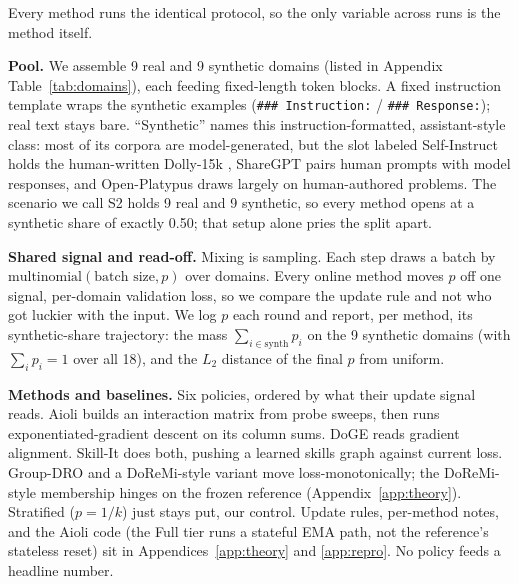 \documentclass{article}
\begin{document}
Every method runs the identical protocol, so the only variable across runs is the method itself.

\textbf{Pool.} We assemble 9 real and 9 synthetic domains (listed in Appendix Table~\ref{tab:domains}), each feeding fixed-length token blocks. A fixed instruction template wraps the synthetic examples (\texttt{\#\#\# Instruction:} / \texttt{\#\#\# Response:}); real text stays bare. ``Synthetic'' names this instruction-formatted, assistant-style class: most of its corpora are model-generated, but the slot labeled Self-Instruct holds the human-written Dolly-15k \citep{dolly2023}, ShareGPT pairs human prompts with model responses, and Open-Platypus draws largely on human-authored problems. The scenario we call S2 holds 9 real and 9 synthetic, so every method opens at a synthetic share of exactly 0.50; that setup alone pries the split apart.

\textbf{Shared signal and read-off.} Mixing is sampling. Each step draws a batch by $\mathrm{multinomial}(\text{batch size}, p)$ over domains. Every online method moves $p$ off one signal, per-domain validation loss, so we compare the update rule and not who got luckier with the input. We log $p$ each round and report, per method, its synthetic-share trajectory: the mass $\sum_{i \in \mathrm{synth}} p_i$ on the 9 synthetic domains (with $\sum_i p_i = 1$ over all 18), and the $L_2$ distance of the final $p$ from uniform.

\textbf{Methods and baselines.} Six policies, ordered by what their update signal reads. Aioli \citep{aioli2024} builds an interaction matrix from probe sweeps, then runs exponentiated-gradient descent on its column sums. DoGE \citep{doge2024} reads gradient alignment. Skill-It \citep{skillit2023} does both, pushing a learned skills graph against current loss. Group-DRO \citep{groupdro2020} and a DoReMi-style variant \citep{doremi2023} move loss-monotonically; the DoReMi-style membership hinges on the frozen reference (Appendix~\ref{app:theory}). Stratified ($p=1/k$) just stays put, our control. Update rules, per-method notes, and the Aioli code (the Full tier runs a stateful EMA path, not the reference's stateless reset) sit in Appendices~\ref{app:theory} and \ref{app:repro}. No policy feeds a headline number.
\end{document}
